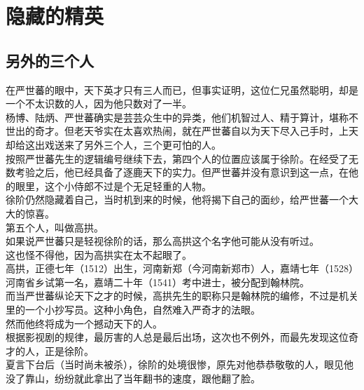 \section{隐藏的精英}
\ifnum{}
	\begin{multicols}{\theparacolNo}
\fi
\subsection{另外的三个人}
在严世蕃的眼中，天下英才只有三人而已，但事实证明，这位仁兄虽然聪明，却是一个不太识数的人，因为他只数对了一半。\\

杨博、陆炳、严世蕃确实是芸芸众生中的异类，他们机智过人、精于算计，堪称不世出的奇才。但老天爷实在太喜欢热闹，就在严世蕃自以为天下尽入己手时，上天却给这出戏送来了另外三个人，三个更可怕的人。\\

按照严世蕃先生的逻辑编号继续下去，第四个人的位置应该属于徐阶。在经受了无数考验之后，他已经具备了逐鹿天下的实力。但严世蕃并没有意识到这一点，在他的眼里，这个小侍郎不过是个无足轻重的人物。\\

徐阶仍然隐藏着自己，当时机到来的时候，他将揭下自己的面纱，给严世蕃一个大大的惊喜。\\

第五个人，叫做高拱。\\

如果说严世蕃只是轻视徐阶的话，那么高拱这个名字他可能从没有听过。\\

这也怪不得他，因为高拱实在太不起眼了。\\

高拱，正德七年（1512）出生，河南新郑（今河南新郑市）人，嘉靖七年（1528）河南省乡试第一名，嘉靖二十年（1541）考中进士，被分配到翰林院。\\

而当严世蕃纵论天下之才的时候，高拱先生的职称只是翰林院的编修，不过是机关里的一个小抄写员。这种小角色，自然难入严奇才的法眼。\\

然而他终将成为一个撼动天下的人。\\

根据影视剧的规律，最厉害的人总是最后出场，这次也不例外，而最先发现这位奇才的人，正是徐阶。\\

夏言下台后（当时尚未被杀），徐阶的处境很惨，原先对他恭恭敬敬的人，眼见他没了靠山，纷纷就此拿出了当年翻书的速度，跟他翻了脸。\\


\end{multicols}

